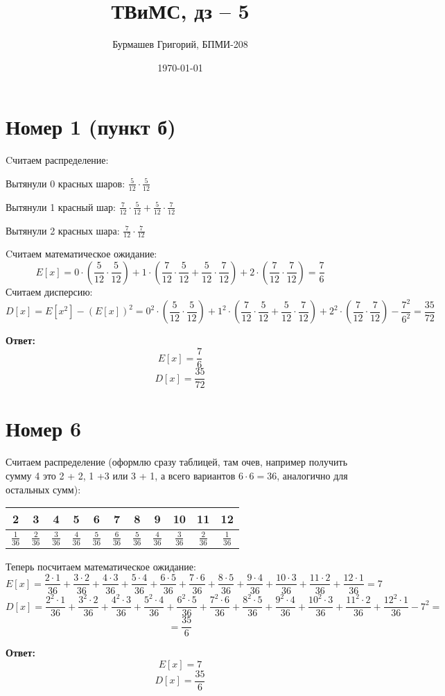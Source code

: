 \documentclass[a4paper,12pt]{article}
\author{Бурмашев Григорий, БПМИ-208}
\title{ТВиМС, дз -- 5}
\date{\today}
\begin{document}
\maketitle 
\section*{Номер 1 (пункт б)}
Cчитаем распределение:
\begin{center}
Вытянули 0 красных шаров: $\frac{5}{12} \cdot \frac{5}{12}$
\end{center}
\begin{center}
Вытянули 1 красный шар: $\frac{7}{12} \cdot \frac{5}{12} + \frac{5}{12}\cdot \frac{7}{12}$
\end{center}
\begin{center}
Вытянули 2 красных шара: $\frac{7}{12} \cdot \frac{7}{12}$
\end{center}
Cчитаем математическое ожидание:
\[
E[x] = 0 \cdot \left(\frac{5}{12} \cdot \frac{5}{12}\right) + 1 \cdot \left(\frac{7}{12} \cdot \frac{5}{12} + \frac{5}{12}\cdot \frac{7}{12}\right) + 2 \cdot \left(\frac{7}{12} \cdot \frac{7}{12}\right) = \frac{7}{6}
\]
Считаем дисперсию:
\[
D[x] = E[x^2] - (E[x])^2 = 0^2 \cdot \left(\frac{5}{12} \cdot \frac{5}{12}\right) + 1^2 \cdot \left(\frac{7}{12} \cdot \frac{5}{12} + \frac{5}{12}\cdot \frac{7}{12}\right) + 2^2 \cdot \left(\frac{7}{12} \cdot \frac{7}{12}\right) - \frac{7^2}{6^2} = \frac{35}{72}
\]
\begin{center}
\textbf{Ответ: } \[
E[x] = \frac{7}{6}
\]
\[
D[x] =  \frac{35}{72}
\]
\end{center}
\clearpage
\section*{Номер 6} 
Считаем распределение (оформлю сразу таблицей, там очев, например получить сумму 4 это 2 + 2, 1 +3 или 3 + 1, а всего вариантов $6 \cdot 6 = 36$, аналогично для остальных сумм): 
\begin{center}
\begin{tabular}{|c|c|c|c|c|c|c|c|c|c|c|}
\hline
 2& 3 &4  & 5 &  6&  7& 8 & 9 &  10&  11& 12 \\
\hline
$\frac{1}{36}$ & $\frac{2}{36}$  &$\frac{3}{36}$   &$\frac{4}{36}$   & $\frac{5}{36}$  &$\frac{6}{36}$   &$\frac{5}{36}$   & $\frac{4}{36}$  & $\frac{3}{36}$  &$\frac{2}{36}$   & $\frac{1}{36}$ \\
\hline
\end{tabular}
\end{center}
Теперь посчитаем математическое ожидание:
\[
E[x] = \frac{2 \cdot 1}{36} + \frac{3\cdot 2}{36} + \frac{4\cdot 3}{36} + \frac{5\cdot 4}{36} + \frac{6\cdot 5}{36} + \frac{7\cdot 6}{36} + \frac{8 \cdot 5}{36} + \frac{9\cdot 4}{36} +\frac{10\cdot 3}{36} +\frac{11\cdot 2}{36} + \frac{12\cdot 1}{36} = 7
\]
\[
D[x] = \frac{2^2\cdot 1}{36} + \frac{3^2\cdot 2}{36} + \frac{4^2\cdot 3}{36} + \frac{5^2\cdot 4}{36} + \frac{6^2\cdot 5}{36} + \frac{7^2\cdot 6}{36} + \frac{8^2 \cdot 5}{36} + \frac{9^2\cdot 4}{36} +\frac{10^2\cdot 3}{36} +\frac{11^2\cdot 2}{36} + \frac{12^2\cdot 1}{36} - 7^2 = 
\]
\[
=
\frac{35}{6}
\]
\begin{center}
\textbf{Ответ: } 
\[
E[x] = 7
\]
\[
D[x] = \frac{35}{6}
\]
\end{center}
\end{document}
